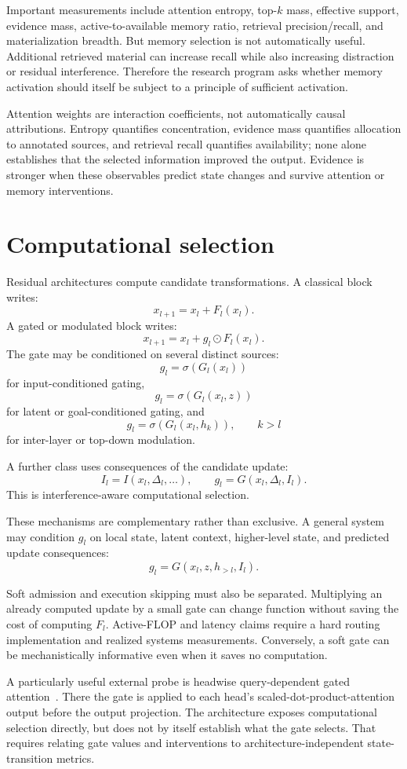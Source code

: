 \documentclass[10pt]{article}
\begin{document}
Important measurements include attention entropy, top-$k$ mass, effective support, evidence mass, active-to-available memory ratio, retrieval precision/recall, and materialization breadth. But memory selection is not automatically useful. Additional retrieved material can increase recall while also increasing distraction or residual interference. Therefore the research program asks whether memory activation should itself be subject to a principle of sufficient activation.

Attention weights are interaction coefficients, not automatically causal attributions. Entropy quantifies concentration, evidence mass quantifies allocation to annotated sources, and retrieval recall quantifies availability; none alone establishes that the selected information improved the output. Evidence is stronger when these observables predict state changes and survive attention or memory interventions.

\section{Computational selection}
Residual architectures compute candidate transformations. A classical block writes:
\[
x_{l+1}=x_l+F_l(x_l).
\]
A gated or modulated block writes:
\[
x_{l+1}=x_l+g_l\odot F_l(x_l).
\]
The gate may be conditioned on several distinct sources:
\[
g_l=\sigma(G_l(x_l))
\]
for input-conditioned gating,
\[
g_l=\sigma(G_l(x_l,z))
\]
for latent or goal-conditioned gating, and
\[
g_l=\sigma(G_l(x_l,h_k)),\qquad k>l
\]
for inter-layer or top-down modulation.

A further class uses consequences of the candidate update:
\[
I_l=I(x_l,\Delta_l,\ldots),
\qquad
g_l=G(x_l,\Delta_l,I_l).
\]
This is interference-aware computational selection.

These mechanisms are complementary rather than exclusive. A general system may condition $g_l$ on local state, latent context, higher-level state, and predicted update consequences:
\[
g_l=G(x_l,z,h_{>l},I_l).
\]

Soft admission and execution skipping must also be separated. Multiplying an already computed update by a small gate can change function without saving the cost of computing $F_l$. Active-FLOP and latency claims require a hard routing implementation and realized systems measurements. Conversely, a soft gate can be mechanistically informative even when it saves no computation.

A particularly useful external probe is headwise query-dependent gated attention~\cite{qiu2025gatedattention}. There the gate is applied to each head's scaled-dot-product-attention output before the output projection. The architecture exposes computational selection directly, but does not by itself establish what the gate selects. That requires relating gate values and interventions to architecture-independent state-transition metrics.
\end{document}
